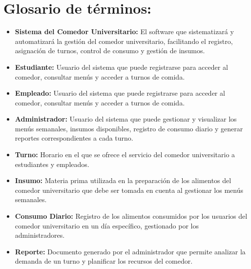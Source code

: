 \documentclass{article}
\begin{document}
    \section*{Glosario de términos:}
    \medskip
    \begin{itemize}
        \item \textbf{Sistema del Comedor Universitario:} El software que sistematizará y automatizará la gestión del comedor universitario, facilitando el registro, asignación de turnos, control de consumo y gestión de insumos.
        \item \textbf{Estudiante:} Usuario del sistema que puede registrarse para acceder al comedor, consultar menús y acceder a turnos de comida.
        \item \textbf{Empleado:} Usuario del sistema que puede registrarse para acceder al comedor, consultar menús y acceder a turnos de comida.
        \item \textbf{Administrador:} Usuario del sistema que puede gestionar y visualizar los menús semanales, insumos disponibles, registro de consumo diario y generar reportes correspondientes a cada turno.
        \item \textbf{Turno:} Horario en el que se ofrece el servicio del comedor universitario a estudiantes y empleados.
        \item \textbf{Insumo:} Materia prima utilizada en la preparación de los alimentos del comedor universitario que debe ser tomada en cuenta al gestionar los menús semanales.
        \item \textbf{Consumo Diario:} Registro de los alimentos consumidos por los usuarios del comedor universitario en un día específico, gestionado por los administradores.
        \item \textbf{Reporte:} Documento generado por el administrador que permite analizar la demanda de un turno y planificar los recursos del comedor.
    \end{itemize}
\end{document}
